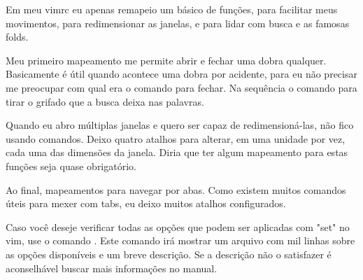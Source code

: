 Em meu vimrc eu apenas remapeio um básico de funções, para facilitar meus movimentos,
para redimensionar as janelas, e para lidar com busca e as famosas folds.


Meu primeiro mapeamento  me permite
abrir e fechar uma dobra qualquer.
Basicamente é útil quando acontece uma dobra por acidente, para eu não precisar me preocupar com
qual era o comando para fechar.
Na sequência o comando para tirar o grifado que a busca deixa nas palavras.

Quando eu abro múltiplas janelas e quero ser capaz de redimensioná-las, não fico usando comandos.
Deixo quatro atalhos para alterar, em uma unidade por vez, cada uma das dimensões da janela.
Diria que ter algum mapeamento para estas funções seja quase obrigatório.


Ao final, mapeamentos para navegar por abas.
Como existem muitos comandos úteis para mexer com tabs, eu deixo muitos
atalhos configurados.

Caso você deseje verificar todas as opções que podem ser aplicadas com "set" no vim, use o comando .
Este comando irá mostrar um arquivo com mil linhas sobre as opções disponíveis e um breve descrição.
Se a descrição não o satisfazer é aconselhável buscar mais informações no manual. 

\newpage
